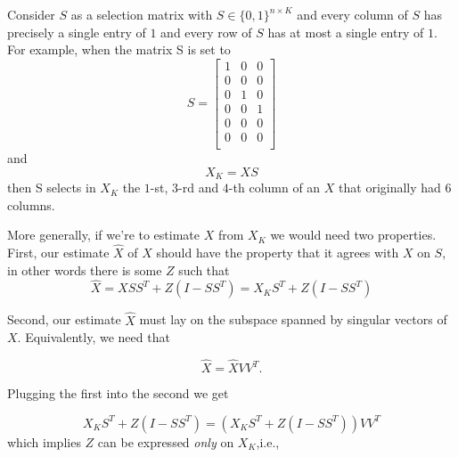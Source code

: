 \documentclass[conference]{IEEEtran}
\begin{document}
Consider $S$ as a selection matrix with $S \in \{0,1\}^{n \times K}$ and every column of $S$ has precisely a single entry of $1$ and every row of $S$ has at most a single entry of $1$.
For example, when the matrix S is set to
$$
S = 
\begin{bmatrix}
1 & 0 & 0 \\
0 & 0 & 0 \\
0 & 1 & 0 \\
0 & 0 & 1 \\
0 & 0 & 0 \\
0 & 0 & 0 \\
\end{bmatrix}
$$
\noindent
and
$$X_K = X S$$
\noindent
then S  selects in $X_K$ the $1$-st, $3$-rd and $4$-th column of an $X$ that originally had $6$ columns.


More generally, if we're to estimate $X$ from $X_K$ we would need two properties.
First, our estimate $\hat{X}$ of $X$ should have the property that it agrees with $X$ on $S$, in other words there is some $Z$ such that
$$
\hat{X} = X S S^T + Z (I-S S^T) = X_K S^T + Z (I-S S^T)
$$

Second, our estimate $\hat{X}$ must lay on the subspace spanned by singular vectors of $X$.  Equivalently, we need that

$$
\hat{X} = \hat{X} V V^T.
$$

Plugging the first into the second we get


$$
X_K S^T + Z (I-S S^T) = (X_K S^T + Z (I-S S^T)) V V^T 
$$
which implies $Z$ can be expressed \emph{only}  on $X_K$,i.e.,
\end{document}
